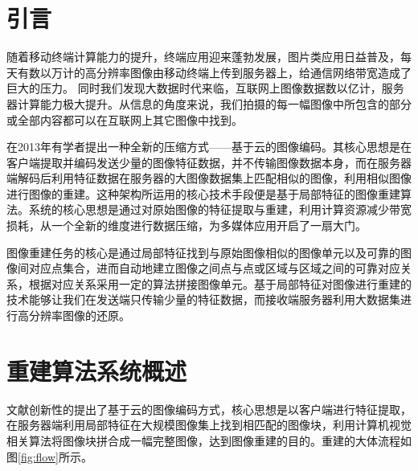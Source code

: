 \documentclass[UTF8]{csoarticle}
\begin{document}

\maketitle



\section{引言}

随着移动终端计算能力的提升，终端应用迎来蓬勃发展，图片类应用日益普及，每天有数以万计的高分辨率图像由移动终端上传到服务器上，给通信网络带宽造成了巨大的压力。
同时我们发现大数据时代来临，互联网上图像数据数以亿计，服务器计算能力极大提升。从信息的角度来说，我们拍摄的每一幅图像中所包含的部分或全部内容都可以在互联网上其它图像中找到。

在2013年有学者提出一种全新的压缩方式——基于云的图像编码。其核心思想是在客户端提取并编码发送少量的图像特征数据，并不传输图像数据本身，而在服务器端解码后利用特征数据在服务器的大图像数据集上匹配相似的图像，利用相似图像进行图像的重建。这种架构所运用的核心技术手段便是基于局部特征的图像重建算法。系统的核心思想是通过对原始图像的特征提取与重建，利用计算资源减少带宽损耗，从一个全新的维度进行数据压缩，为多媒体应用开启了一扇大门。

图像重建任务的核心是通过局部特征找到与原始图像相似的图像单元以及可靠的图像间对应点集合，进而自动地建立图像之间点与点或区域与区域之间的可靠对应关系，根据对应关系采用一定的算法拼接图像单元。基于局部特征对图像进行重建的技术能够让我们在发送端只传输少量的特征数据，而接收端服务器利用大数据集进行高分辨率图像的还原。



\section{重建算法系统概述}
文献\cite{Cloud}创新性的提出了基于云的图像编码方式，核心思想是以客户端进行特征提取，在服务器端利用局部特征在大规模图像集上找到相匹配的图像块，利用计算机视觉相关算法将图像块拼合成一幅完整图像，达到图像重建的目的。重建的大体流程如图\ref{fig:flow}所示。
\end{document}
